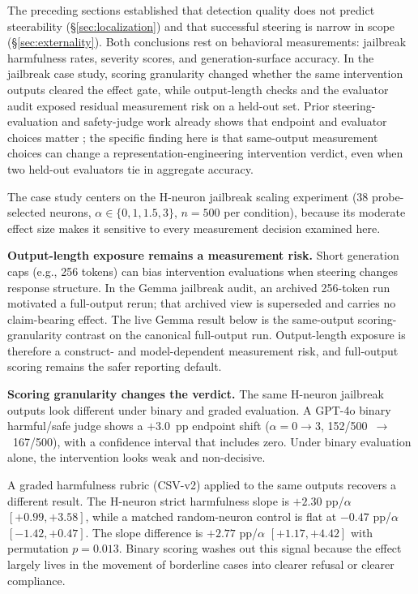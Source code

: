 \documentclass{article}
\begin{document}
The preceding sections established that detection quality does not predict steerability (\S\ref{sec:localization}) and that successful steering is narrow in scope (\S\ref{sec:externality}).
Both conclusions rest on behavioral measurements: jailbreak harmfulness rates, severity scores, and generation-surface accuracy.
In the jailbreak case study, scoring granularity changed whether the same intervention outputs cleared the effect gate, while output-length checks and the evaluator audit exposed residual measurement risk on a held-out set.
Prior steering-evaluation and safety-judge work already shows that endpoint and evaluator choices matter \citep{pres2024reliable,souly2024strongreject,chen2025safer,eiras2025judge}; the specific finding here is that same-output measurement choices can change a representation-engineering intervention verdict, even when two held-out evaluators tie in aggregate accuracy.

The case study centers on the H-neuron jailbreak scaling experiment (38 probe-selected neurons, $\alpha \in \{0, 1, 1.5, 3\}$, $n = 500$ per condition), because its moderate effect size makes it sensitive to every measurement decision examined here.

\textbf{Output-length exposure remains a measurement risk.}
Short generation caps (e.g., 256 tokens) can bias intervention evaluations when steering changes response structure.
In the Gemma jailbreak audit, an archived 256-token run motivated a full-output rerun; that archived view is superseded and carries no claim-bearing effect.
The live Gemma result below is the same-output scoring-granularity contrast on the canonical full-output run.
Output-length exposure is therefore a construct- and model-dependent measurement risk, and full-output scoring remains the safer reporting default.

\textbf{Scoring granularity changes the verdict.}
The same H-neuron jailbreak outputs look different under binary and graded evaluation.
A GPT-4o binary harmful/safe judge shows a $+3.0$~pp endpoint shift ($\alpha = 0 \to 3$, 152/500~$\to$~167/500), with a confidence interval that includes zero.
Under binary evaluation alone, the intervention looks weak and non-decisive.

A graded harmfulness rubric (CSV-v2) applied to the same outputs recovers a different result.
The H-neuron strict harmfulness slope is $+2.30$ pp/$\alpha$ $[+0.99, +3.58]$, while a matched random-neuron control is flat at $-0.47$ pp/$\alpha$ $[-1.42, +0.47]$.
The slope difference is $+2.77$ pp/$\alpha$ $[+1.17, +4.42]$ with permutation $p = 0.013$.
Binary scoring washes out this signal because the effect largely lives in the movement of borderline cases into clearer refusal or clearer compliance.
\end{document}
